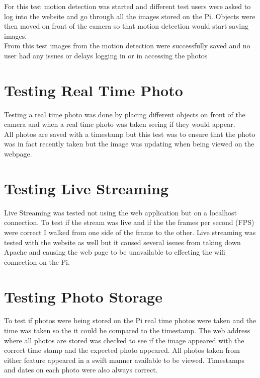 \documentclass[]{report}
\begin{document}
For this test motion detection was started and different test users were asked to log into the website and go through all the images stored on the Pi. Objects were then moved on front of the camera so that motion detection would start saving images.\\ 

From this test images from the motion detection were successfully saved and no user had any issues or delays logging in or in accessing the photos\\


\section{Testing Real Time Photo}
\label{sec:realPhotoTest}
%

Testing a real time photo was done by placing different objects on front of the camera and when a real time photo was taken seeing if they would appear. \\

All photos are saved with a timestamp but this test was to ensure that the photo was in fact recently taken but the image was updating when being viewed on the webpage.\\


\section{Testing Live Streaming}
\label{sec:liveStreamTest}
%
Live Streaming was tested not using the web application but on a localhost connection. To test if the stream was live and if the the frames per second (FPS) were correct I walked from one side of the frame to the other. 
Live streaming was tested with the website as well but it caused several issues from taking down Apache and causing the web page to be unavailable to effecting the wifi connection on the Pi.

\section{Testing Photo Storage}
\label{sec:photoStorageTest}
%
To test if photos were being stored on the Pi real time photos were taken and the time was taken  so the it could be compared to the timestamp. The web address where all photos are stored was checked to see if the image appeared with the correct time stamp and the expected photo appeared. All photos taken from either feature appeared in a swift manner available to be viewed. Timestamps and dates on each photo were also always correct.\\
\end{document}
